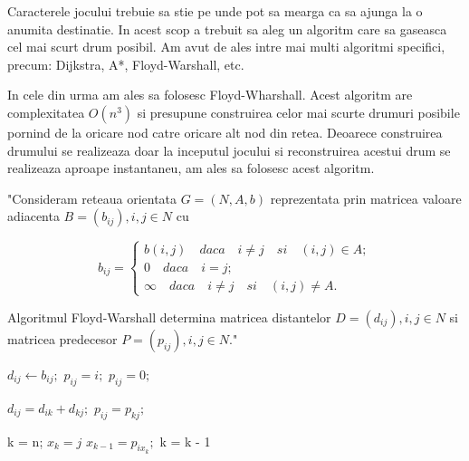 \documentclass[12pt, a4paper]{article}
\begin{document}
	Caracterele jocului trebuie sa stie pe unde pot sa mearga ca sa ajunga la o anumita destinatie. In acest scop a trebuit sa aleg un algoritm care sa gaseasca cel mai scurt drum posibil. Am avut de ales intre mai multi algoritmi specifici, precum: Dijkstra, A*, Floyd-Warshall, etc.
	
	In cele din urma am ales sa folosesc Floyd-Wharshall. Acest algoritm are complexitatea $O(n^3)$ si presupune construirea celor mai scurte drumuri posibile pornind de la oricare nod catre oricare alt nod din retea. Deoarece construirea drumului se realizeaza doar la inceputul jocului si reconstruirea acestui drum se realizeaza aproape instantaneu, am ales sa folosesc acest algoritm.
	
	"Consideram reteaua orientata $G = (N, A, b)$ reprezentata prin matricea valoare adiacenta $B = (b_{ij}), i, j \in N$ cu
	
	\begin{equation*}
		b_{ij} = \begin{cases}
			b(i, j) \quad daca \quad i \neq j \quad si \quad (i, j) \in A; \\
			0 \quad daca \quad i = j; \\
			\infty \quad daca \quad i \neq j \quad si \quad (i, j) \neq A.
		\end{cases}
	\end{equation*}

	Algoritmul Floyd-Warshall determina matricea distantelor $D = (d_{ij}), i, j \in N$ si matricea predecesor $P = (p_{ij}), i, j \in N$." \cite{grafuriAnul2}
	
	\begin{algorithmic}
					\State $d_{ij} \gets b_{ij};$
						\State $p_{ij} = i;$
					\Else
						\State $p_{ij} = 0;$
					\EndIf
				\EndFor
			\EndFor
			
							\State $d_{ij} = d_{ik} + d_{kj};$
							\State $p_{ij} = p_{kj};$
						\EndIf
					\EndFor
				\EndFor
			\EndFor
		\EndFunction
	\end{algorithmic}

	\begin{algorithmic}
		\Function{Reconstruire Drum}{}
			\State k = n;
			\State $x_k = j$
			\While{$x_k \neq i$}
				\State $x_{k - 1} = p_{ix_k};$
				\State k = k - 1
			\EndWhile
		\EndFunction
	\end{algorithmic}
\end{document}
